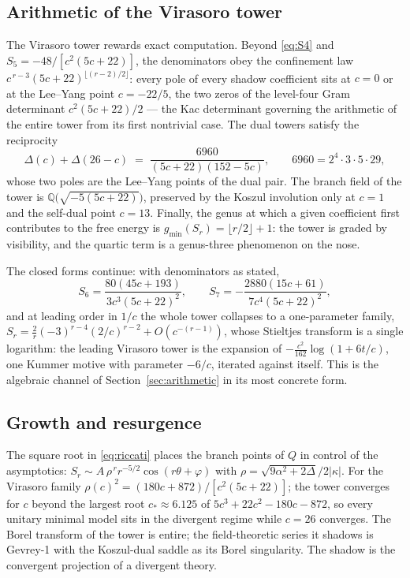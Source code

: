 \documentclass[11pt]{amsart}
\numberwithin{equation}{section}
\theoremstyle{plain}
\theoremstyle{definition}
\theoremstyle{remark}
\newcommand{\bQ}{\mathbb{Q}}
\begin{document}
\subsection{Arithmetic of the Virasoro tower}

The Virasoro tower rewards exact computation. Beyond \eqref{eq:S4} and
$S_5=-48/[c^{2}(5c+22)]$, the denominators obey the confinement law
$c^{\,r-3}(5c+22)^{\lfloor(r-2)/2\rfloor}$: every pole of every shadow
coefficient sits at $c=0$ or at the Lee--Yang point $c=-22/5$, the two
zeros of the level-four Gram determinant $c^{2}(5c+22)/2$ --- the Kac
determinant governing the arithmetic of the entire tower from its first
nontrivial case. The dual towers satisfy the reciprocity
\begin{equation}
\Delta(c)+\Delta(26-c)\;=\;\frac{6960}{(5c+22)(152-5c)},
\qquad 6960=2^{4}\cdot3\cdot5\cdot29,
\end{equation}
whose two poles are the Lee--Yang points of the dual pair. The branch
field of the tower is $\bQ\bigl(\sqrt{-5(5c+22)}\bigr)$, preserved by
the Koszul involution only at $c=1$ and the self-dual point $c=13$.
Finally, the genus at which a given coefficient first contributes to
the free energy is $g_{\min}(S_r)=\lfloor r/2\rfloor+1$: the tower is
graded by visibility, and the quartic term is a genus-three phenomenon
on the nose.

The closed forms continue: with denominators as stated,
\begin{equation}
S_6=\frac{80(45c+193)}{3c^{3}(5c+22)^{2}},\qquad
S_7=-\frac{2880(15c+61)}{7c^{4}(5c+22)^{2}},
\end{equation}
and at leading order in $1/c$ the whole tower collapses to a
one-parameter family, $S_r=\tfrac2r(-3)^{r-4}(2/c)^{r-2}+O(c^{-(r-1)})$,
whose Stieltjes transform is a single logarithm: the leading Virasoro
tower is the expansion of $-\tfrac{c^{2}}{162}\log(1+6t/c)$, one
Kummer motive with parameter $-6/c$, iterated against itself. This is
the algebraic channel of Section~\ref{sec:arithmetic} in its most
concrete form.

\subsection{Growth and resurgence}

The square root in \eqref{eq:riccati} places the branch points of $Q$ in
control of the asymptotics: $S_r\sim A\,\rho^{\,r}r^{-5/2}\cos(r\theta+\varphi)$
with $\rho=\sqrt{9\alpha^{2}+2\Delta}/2|\kappa|$. For the Virasoro family
$\rho(c)^2=(180c+872)/[c^{2}(5c+22)]$; the tower converges for $c$ beyond
the largest root $c_{*}\approx6.125$ of $5c^{3}+22c^{2}-180c-872$, so
every unitary minimal model sits in the divergent regime while $c=26$
converges. The Borel transform of the tower is entire; the field-theoretic
series it shadows is Gevrey-1 with the Koszul-dual saddle as its Borel
singularity. The shadow is the convergent projection of a divergent
theory.
\end{document}
